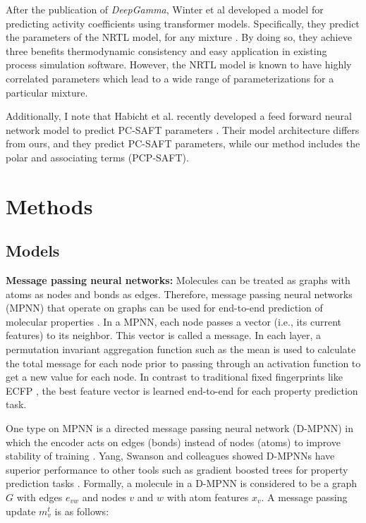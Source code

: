 After the publication of \textit{DeepGamma}, Winter et al developed a model for predicting activity coefficients using transformer models. Specifically, they predict the parameters of the NRTL model, for any mixture \cite{Winter2022}. By doing so, they achieve three benefits thermodynamic consistency and easy application in existing process simulation software. However, the NRTL model is known to have highly correlated parameters which lead to a wide range of parameterizations for a particular mixture. 

Additionally, I note that Habicht et al. recently developed a feed forward neural network model to predict PC-SAFT parameters \cite{Habicht2023}.  Their model architecture differs from ours, and they predict PC-SAFT parameters, while our method includes the polar and associating terms (PCP-SAFT). 


\section{Methods}
\subsection{Models}

\noindent
\textbf{Message passing neural networks:} Molecules can be treated as graphs with atoms as nodes and bonds as edges. Therefore, message passing neural networks (MPNN) that operate on graphs can be used for end-to-end prediction of molecular properties \cite{Gilmer2017}.  In a MPNN, each node passes a vector (i.e., its current features) to its neighbor. This  vector is called a message. In each layer, a permutation invariant aggregation function such as the mean is used to calculate the total message for each node prior to passing through an activation function to get a new value for each node.  In contrast to traditional fixed fingerprints like ECFP \cite{Rogers2010}, the best feature vector is learned end-to-end for each property prediction task.

One type on MPNN is a directed message passing neural network (D-MPNN) in which the encoder acts on edges (bonds) instead of nodes (atoms) to improve stability of training \cite{Yang2019}. Yang, Swanson and colleagues showed D-MPNNs have superior performance to other tools such as gradient boosted trees for property prediction tasks \cite{Yang2019}. Formally, a molecule in a D-MPNN is considered to be a graph $G$ with edges $e_{vw}$ and nodes $v$ and $w$ with atom features $x_v$. A message passing update $m_v^{t}$ is as follows:

